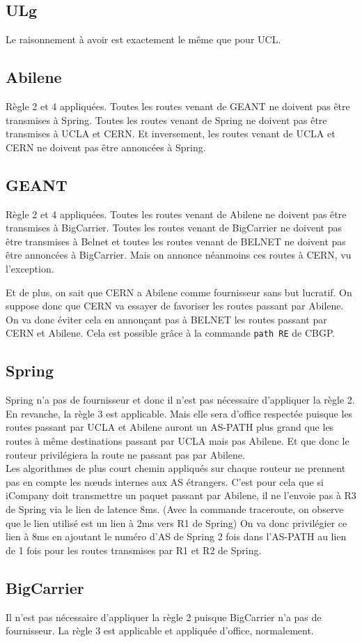\documentclass[a4paper, 12pt]{article}
\begin{document}
\subsection{ULg}
Le raisonnement à avoir est exactement le même que pour UCL.

\subsection{Abilene}
Règle 2 et 4 appliquées. Toutes les routes venant de GEANT ne doivent pas être transmises à Spring.
Toutes les routes venant de Spring ne doivent pas être transmises à UCLA et CERN.
Et inversement, les routes venant de UCLA et CERN ne doivent pas être annoncées à Spring.

\subsection{GEANT}
Règle 2 et 4 appliquées. Toutes les routes venant de Abilene ne doivent pas être transmises à BigCarrier.
Toutes les routes venant de BigCarrier ne doivent pas être transmises à Belnet et toutes les routes venant de BELNET ne doivent pas être annoncées à BigCarrier.
Mais on annonce néanmoins ces routes à CERN, vu l'exception.

Et de plus, on sait que CERN a Abilene comme fournisseur sans but lucratif. %
On suppose donc que CERN va essayer de favoriser les routes passant par Abilene.
On va donc éviter cela en annonçant pas à BELNET les routes passant par CERN et Abilene.
Cela est possible grâce à la commande \texttt{path RE} de CBGP.

\subsection{Spring} %
Spring n'a pas de fournisseur et donc il n'est pas nécessaire d'appliquer la règle 2.
\\

En revanche, la règle 3 est applicable.
Mais elle sera d'office respectée puisque les routes passant par UCLA et Abilene auront un AS-PATH plus grand que les routes à même destinations passant par UCLA mais pas Abilene.
Et que donc le routeur privilégiera la route ne passant pas par Abilene.
\\

Les algorithmes de plus court chemin appliqués sur chaque routeur ne prennent pas en compte les nœuds internes aux AS étrangers.
C'est pour cela que si iCompany doit transmettre un paquet passant par Abilene, il ne l'envoie pas à R3 de Spring via le lien de latence 8ms.
(Avec la commande traceroute, on observe que le lien utilisé est un lien à 2ms vers R1 de Spring)
On va donc privilégier ce lien à 8ms en ajoutant le numéro d'AS de Spring 2 fois dans l'AS-PATH au lien de 1 fois pour les routes transmises par R1 et R2 de Spring.

\subsection{BigCarrier}%
Il n'est pas nécessaire d'appliquer la règle 2 puisque BigCarrier n'a pas de fournisseur.
La règle 3 est applicable et appliquée d'office, normalement.
\end{document}
